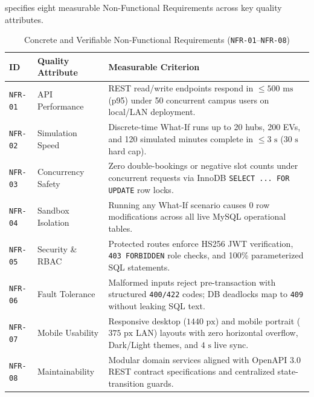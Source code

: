 \label{subsec:non-functional-requirements}
 specifies eight measurable Non-Functional Requirements across key quality attributes.

\begin{table}[H]
  \centering
  \singlespacing\footnotesize
  \caption{Concrete and Verifiable Non-Functional Requirements (\texttt{NFR-01}--\texttt{NFR-08})}
  \label{tab:nfr}
  \renewcommand{\arraystretch}{1.22}
  \begin{tabularx}{\textwidth}{|C{1.5cm}|L{2.8cm}|Y|}
    \hline
    \textbf{ID} & \textbf{Quality Attribute} & \textbf{Measurable Criterion} \\
    \hline
    \texttt{NFR-01} & API Performance & REST read/write endpoints respond in $\le 500\text{ ms}$ (p95) under 50 concurrent campus users on local/LAN deployment. \\
    \hline
    \texttt{NFR-02} & Simulation Speed & Discrete-time What-If runs up to 20 hubs, 200 EVs, and 120 simulated minutes complete in $\le 3\text{ s}$ ($30\text{ s}$ hard cap). \\
    \hline
    \texttt{NFR-03} & Concurrency Safety & Zero double-bookings or negative slot counts under concurrent requests via InnoDB \texttt{SELECT ... FOR UPDATE} row locks. \\
    \hline
    \texttt{NFR-04} & Sandbox Isolation & Running any What-If scenario causes $0$ row modifications across all live MySQL operational tables. \\
    \hline
    \texttt{NFR-05} & Security \& RBAC & Protected routes enforce HS256 JWT verification, \texttt{403 FORBIDDEN} role checks, and 100\% parameterized SQL statements. \\
    \hline
    \texttt{NFR-06} & Fault Tolerance & Malformed inputs reject pre-transaction with structured \texttt{400/422} codes; DB deadlocks map to \texttt{409} without leaking SQL text. \\
    \hline
    \texttt{NFR-07} & Mobile Usability & Responsive desktop ($1440\text{ px}$) and mobile portrait ($375\text{ px}$ LAN) layouts with zero horizontal overflow, Dark/Light themes, and $4\text{ s}$ live sync. \\
    \hline
    \texttt{NFR-08} & Maintainability & Modular domain services aligned with OpenAPI 3.0 REST contract specifications and centralized state-transition guards. \\
    \hline
  \end{tabularx}
\end{table}

